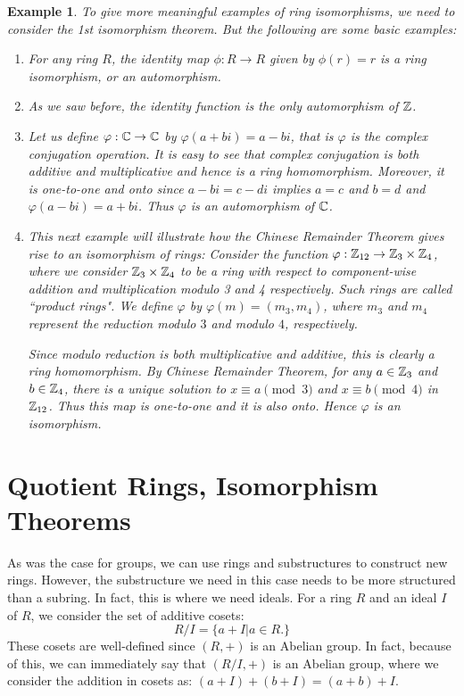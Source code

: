 \documentclass[12pt]{article}
\theoremstyle{plain}
\newtheorem{example}{Example}
\theoremstyle{definition}
\theoremstyle{remark}
\begin{document}
\begin{example} To give more meaningful examples of ring isomorphisms, we need to consider the 1st isomorphism theorem. But the following are some basic examples:
\begin{enumerate}
    \item For any ring $R$, the identity map $\phi:R\rightarrow R$ given by $\phi(r)=r$ is a ring isomorphism, or an automorphism.
    \item As we saw before, the identity function is the only automorphism of $\mathbb{Z}$.
    \item Let us define $\varphi:\mathbb{C} \rightarrow \mathbb{C}$ by $\varphi(a+bi)=a-bi$, that is $\varphi$ is the complex conjugation operation. It is easy to see that complex conjugation is both additive and multiplicative and hence is a ring homomorphism. Moreover, it is one-to-one and onto since $a-bi=c-di$ implies $a=c$ and $b=d$ and $\varphi(a-bi)=a+bi$. Thus $\varphi$ is an automorphism of $\mathbb{C}$.
    \item This next example will illustrate how the Chinese Remainder Theorem gives rise to an isomorphism of rings:
    Consider the function $\varphi:\mathbb{Z}_{12}\rightarrow \mathbb{Z}_{3}\times \mathbb{Z}_{4}$, where we consider $\mathbb{Z}_3\times \mathbb{Z}_4$ to be a ring with respect to component-wise addition and multiplication modulo 3 and 4 respectively. Such rings are called ``product rings".
    We define $\varphi$ by $\varphi(m) = (m_3, m_4)$, where $m_3$ and $m_4$ represent the reduction modulo $3$ and modulo $4$, respectively.

    Since modulo reduction is both multiplicative and additive, this is clearly a ring homomorphism. By Chinese Remainder Theorem, for any $a \in \mathbb{Z}_3$ and $b\in \mathbb{Z}_4$, there is a unique solution to  $x\equiv a \pmod{3}$ and $x\equiv b\pmod{4}$ in $\mathbb{Z}_{12}$. Thus this map is one-to-one and it is also onto. Hence $\varphi$ is an isomorphism.
 \end{enumerate}
\end{example}

\section{Quotient Rings, Isomorphism Theorems}
As was the case for groups, we can use rings and substructures to construct new rings. However, the substructure we need in this case needs to be more structured than a subring. In fact, this is where we need ideals. For a ring $R$ and an ideal $I$ of $R$, we consider the set of additive cosets:
$$R/I = \{a+I|a\in R.\}$$
These cosets are well-defined since $(R,+)$ is an Abelian group. In fact, because of this, we can immediately say that $(R/I,+)$ is an Abelian group, where we consider the addition in cosets as: $(a+I)+(b+I) = (a+b)+I$.
\end{document}
